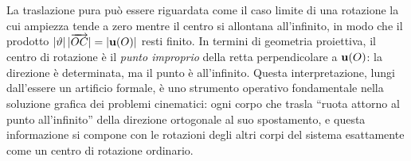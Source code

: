 


\begin{oss}
	La traslazione pura può essere riguardata come il caso
	limite di una rotazione la cui ampiezza tende a zero mentre
	il centro si allontana all'infinito, in modo che il
	prodotto $|\vartheta|\,|\overrightarrow{OC}| = |\mathbf{u}(O)|$
	resti finito. In termini di geometria proiettiva, il centro
	di rotazione è il \textit{punto improprio} della retta
	perpendicolare a $\mathbf{u}(O)$: la direzione è determinata, ma
	il punto è all'infinito. Questa interpretazione, lungi
	dall'essere un artificio formale, è uno strumento operativo
	fondamentale nella soluzione grafica dei problemi
	cinematici: ogni corpo che trasla ``ruota attorno al punto
	all'infinito'' della direzione ortogonale al suo
	spostamento, e questa informazione si compone con le
	rotazioni degli altri corpi del sistema esattamente come un
	centro di rotazione ordinario.
\end{oss}



\bigskip


